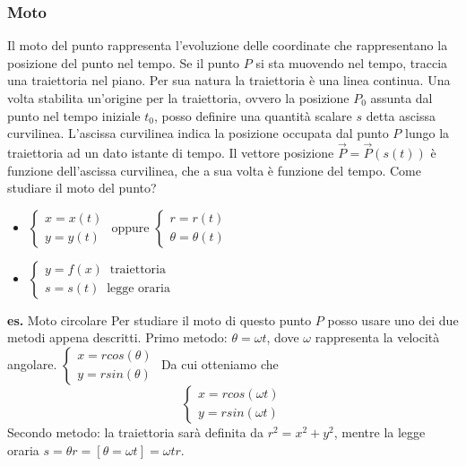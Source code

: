 \subsubsection{Moto}
Il moto del punto rappresenta l'evoluzione delle coordinate che rappresentano la posizione del punto nel tempo. Se il punto $P$ si sta muovendo nel tempo, traccia una traiettoria nel piano. Per sua natura la traiettoria è una linea continua.\newline
Una volta stabilita un'origine per la traiettoria, ovvero la posizione $P_0$ assunta dal punto nel tempo iniziale $t_0$, posso definire una quantità scalare $s$ detta ascissa curvilinea. L'ascissa curvilinea indica la posizione occupata dal punto $P$ lungo la traiettoria ad un dato istante di tempo. Il vettore posizione $\vec{P} = \vec{P}(s(t))$ è funzione dell'ascissa curvilinea, che a sua volta è funzione del tempo.\newline
Come studiare il moto del punto?
\begin{itemize}
    \item $\begin{cases}
        x = x(t)\\
        y = y(t)
    \end{cases}$ oppure $\begin{cases}
        r = r(t)\\
        \theta = \theta(t)
    \end{cases}$
    \item $\begin{cases}
        y=f(x) \;\; \text{traiettoria}\;\\
        s = s(t) \;\; \text{legge oraria}\;
    \end{cases}$
\end{itemize}
\textbf{es.} Moto circolare \newline
Per studiare il moto di questo punto $P$ posso usare uno dei due metodi appena descritti.\newline
Primo metodo:\newline
$\theta = \omega t$, dove $\omega$ rappresenta la velocità angolare.\newline
$\begin{cases}
    x = r cos(\theta)\\
    y = r sin(\theta)
\end{cases}$
Da cui otteniamo che
\[
    \begin{cases}
        x = r cos(\omega t)\\
        y = r sin(\omega t)
    \end{cases}
\]
Secondo metodo:\newline
la traiettoria sarà definita da $r^2 = x^2 + y^2$, mentre la legge oraria $s = \theta r = [\theta = \omega t] = \omega t r$.\newline
